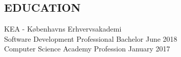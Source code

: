 \documentclass[margin, 10pt, hidelinks]{res} %
\newcommand{\emphasize}{\large} %
\begin{document}
\begin{resume}


\section{EDUCATION}

KEA - Københavns Erhvervsakademi 	\\
{\emphasize Software Development}  Professional Bachelor   \hfill  June 2018\\
{\emphasize Computer Science}  Academy Profession  \hfill  January 2017 \\





\end{resume}
\end{document}
